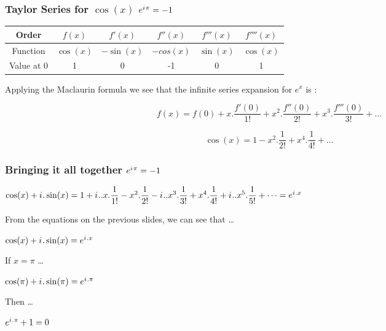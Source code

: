 \documentclass[10pt]{beamer}
\newcommand{\iu}{{i\mkern1mu}}
\begin{document}
\begin{frame}
	\frametitle{Taylor Series for $\cos(x)$ \hspace{25pt} \textcolor{pink}{\Huge\(e^{\iu \pi} = -1\)}}
	\begin{center}
		\begin{tabular}{|c|c|c|c|c|c|}
			\hline
			Order & $f(x)$    & $f'(x)$    & $f''(x)$  & $f'''(x)$ & $f''''(x)$ \\
			\hline
			Function & $\cos(x)$ & $-\sin(x)$ & $-cos(x)$ & $\sin(x)$ & $\cos(x)$  \\
			\hline
			Value at 0 & 1         & 0          & -1        & 0         & 1          \\
			\hline
		\end{tabular}
	\end{center}
	\vspace{20pt}
	Applying the Maclaurin formula we see that the infinite series expansion for $e^x$ is :

	\large $$f(x) = f(0)+x.\dfrac{f'(0)}{1!}+ x^2.\dfrac{f''(0)}{2!} +x^3.\dfrac{f'''(0)}{3!} + \dots$$

	\large $$\cos(x) = 1- x^2.\dfrac{1}{2!} +x^4.\dfrac{1}{4!} + \dots$$

\end{frame}

\begin{frame}

	\frametitle{Bringing it all together \hspace{25pt} \textcolor{pink}{\Huge\(e^{\iu \pi} = -1\)}}
	\begin{center}
	$\cos(x) + \iu.\sin(x) = 1+\iu..x.\dfrac{1}{1!}- x^2.\dfrac{1}{2!} -\iu..x^3.\dfrac{1}{3!} +x^4.\dfrac{1}{4!} + \iu..x^5.\dfrac{1}{5!} +\dots = e^{\iu.x}$
	\end{center}

	From the equations on the previous slides, we can see that \dots
	\begin{center}
		$\cos(x) + \iu.\sin(x) = e^{\iu.x}$ 
	\end{center} 
	If $x = \pi$ \dots
	\begin{center}
		$\cos(\pi) + \iu.\sin(\pi) = e^{\iu.\pi}$ \\
	\end{center}
	Then \dots
	\begin{center}
		$e^{\iu.\pi} + 1 = 0$
	\end{center}

\end{frame}
\end{document}
